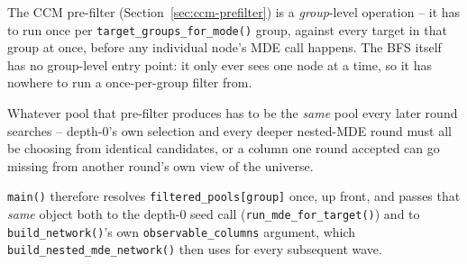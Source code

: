 \documentclass[11pt]{article}
\begin{document}
\begin{steps}
\item The CCM pre-filter (Section~\ref{sec:ccm-prefilter}) is a \emph{group}-level operation -- it has to run once per \texttt{target\_groups\_for\_mode()} group, against every target in that group at once, before any individual node's MDE call happens. The BFS itself has no group-level entry point: it only ever sees one node at a time, so it has nowhere to run a once-per-group filter from.
\item Whatever pool that pre-filter produces has to be the \emph{same} pool every later round searches -- depth-0's own selection and every deeper nested-MDE round must all be choosing from identical candidates, or a column one round accepted can go missing from another round's own view of the universe.
\item \texttt{main()} therefore resolves \texttt{filtered\_pools[group]} once, up front, and passes that \emph{same} object both to the depth-0 seed call (\texttt{run\_mde\_for\_target()}) and to \texttt{build\_network()}'s own \texttt{observable\_columns} argument, which \texttt{build\_nested\_mde\_network()} then uses for every subsequent wave.
\end{steps}
\end{document}
